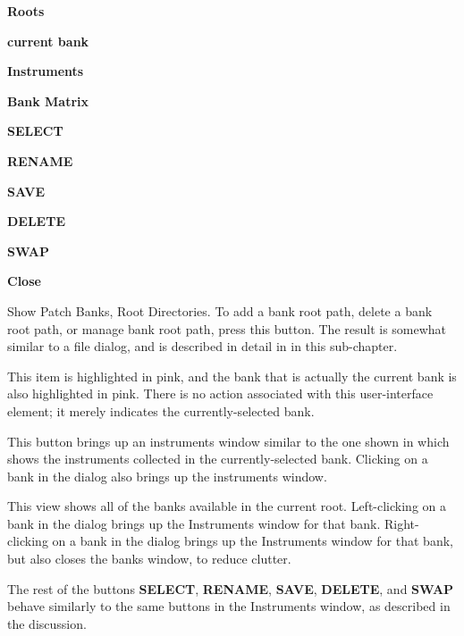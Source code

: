    \begin{enumber}
      \item \textbf{Roots}
      \item \textbf{current bank}
      \item \textbf{Instruments}
      \item \textbf{Bank Matrix}
      \item \textbf{SELECT}
      \item \textbf{RENAME}
      \item \textbf{SAVE}
      \item \textbf{DELETE}
      \item \textbf{SWAP}
      \item \textbf{Close}
   \end{enumber}

   \setcounter{ItemCounter}{0}      %

   Show Patch Banks, Root Directories.
   To add a bank root path, delete a bank root path, or manage bank root path,
   press this button.  The result is somewhat similar to a file dialog,
   and is described in detail in 
    in
   this sub-chapter.

   This item is highlighted in pink, and the bank that is actually the current
   bank is also highlighted in pink.  There is no action associated with this
   user-interface element; it merely indicates the currently-selected bank.

   This button brings up an instruments window similar
   to the one shown in
    which shows
   the instruments collected in the currently-selected bank.
   Clicking on a bank in the dialog also brings up the instruments window.

   This view shows all of the banks available in the current root.
   Left-clicking on a bank in the dialog brings up the Instruments window for
   that bank.
   Right-clicking on a bank in the dialog brings up the Instruments window for
   that bank, but also closes the banks window, to reduce clutter.

   The rest of the buttons \textbf{SELECT}, \textbf{RENAME}, \textbf{SAVE},
   \textbf{DELETE}, and \textbf{SWAP} behave similarly to the same buttons in
   the Instruments window, as
   described in the
    discussion.

